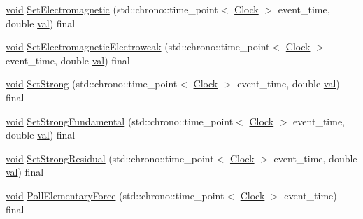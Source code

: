 \begin{DoxyCompactItemize}
\item 
\mbox{\hyperlink{glad_8h_a950fc91edb4504f62f1c577bf4727c29}{void}} \mbox{\hyperlink{class_cognitive_network_a31764cd5746369d16b45f2ff74806a0b}{Set\+Electromagnetic}} (std\+::chrono\+::time\+\_\+point$<$ \mbox{\hyperlink{universe_8h_a0ef8d951d1ca5ab3cfaf7ab4c7a6fd80}{Clock}} $>$ event\+\_\+time, double \mbox{\hyperlink{glad_8h_a26942fd2ed566ef553eae82d2c109c8f}{val}}) final
\item 
\mbox{\hyperlink{glad_8h_a950fc91edb4504f62f1c577bf4727c29}{void}} \mbox{\hyperlink{class_cognitive_network_a270f6842ec14b3e5b80dedf7b48ea6f4}{Set\+Electromagnetic\+Electroweak}} (std\+::chrono\+::time\+\_\+point$<$ \mbox{\hyperlink{universe_8h_a0ef8d951d1ca5ab3cfaf7ab4c7a6fd80}{Clock}} $>$ event\+\_\+time, double \mbox{\hyperlink{glad_8h_a26942fd2ed566ef553eae82d2c109c8f}{val}}) final
\item 
\mbox{\hyperlink{glad_8h_a950fc91edb4504f62f1c577bf4727c29}{void}} \mbox{\hyperlink{class_cognitive_network_a50f2a12c9873e623d6247318b041ba30}{Set\+Strong}} (std\+::chrono\+::time\+\_\+point$<$ \mbox{\hyperlink{universe_8h_a0ef8d951d1ca5ab3cfaf7ab4c7a6fd80}{Clock}} $>$ event\+\_\+time, double \mbox{\hyperlink{glad_8h_a26942fd2ed566ef553eae82d2c109c8f}{val}}) final
\item 
\mbox{\hyperlink{glad_8h_a950fc91edb4504f62f1c577bf4727c29}{void}} \mbox{\hyperlink{class_cognitive_network_ac54286eea279f5caa98b642b9084fd55}{Set\+Strong\+Fundamental}} (std\+::chrono\+::time\+\_\+point$<$ \mbox{\hyperlink{universe_8h_a0ef8d951d1ca5ab3cfaf7ab4c7a6fd80}{Clock}} $>$ event\+\_\+time, double \mbox{\hyperlink{glad_8h_a26942fd2ed566ef553eae82d2c109c8f}{val}}) final
\item 
\mbox{\hyperlink{glad_8h_a950fc91edb4504f62f1c577bf4727c29}{void}} \mbox{\hyperlink{class_cognitive_network_a6f7210dd8c2786518329faa61b6e14d5}{Set\+Strong\+Residual}} (std\+::chrono\+::time\+\_\+point$<$ \mbox{\hyperlink{universe_8h_a0ef8d951d1ca5ab3cfaf7ab4c7a6fd80}{Clock}} $>$ event\+\_\+time, double \mbox{\hyperlink{glad_8h_a26942fd2ed566ef553eae82d2c109c8f}{val}}) final
\item 
\mbox{\hyperlink{glad_8h_a950fc91edb4504f62f1c577bf4727c29}{void}} \mbox{\hyperlink{class_cognitive_network_ac97c08a0af7dc0d02fbe059827b6be87}{Poll\+Elementary\+Force}} (std\+::chrono\+::time\+\_\+point$<$ \mbox{\hyperlink{universe_8h_a0ef8d951d1ca5ab3cfaf7ab4c7a6fd80}{Clock}} $>$ event\+\_\+time) final
\end{DoxyCompactItemize}
